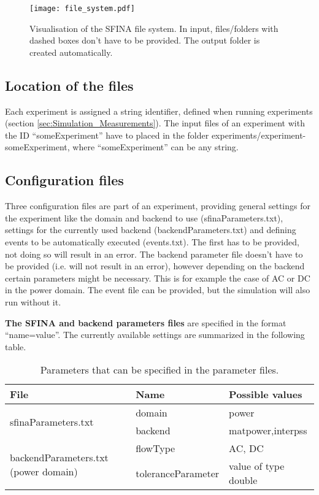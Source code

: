 \documentclass[11pt,fleqn]{book} %
\begin{document}
\begin{figure}[h]
\centering\texttt{[image: file\_system.pdf]}
\caption{Visualisation of the SFINA file system. In input, files/folders with dashed boxes don't have to be provided. The output folder is created automatically.}
\label{fig:file_system}
\end{figure}

\subsection{Location of the files}
Each experiment is assigned a string identifier, defined when running experiments (section \ref{sec:Simulation_Measurements}). The input files of an experiment with the ID “someExperiment” have to placed in the folder experiments/experiment-someExperiment, where “someExperiment” can be any string.

\subsection{Configuration files}\label{subsec:config_files}
Three configuration files are part of an experiment, providing general settings for the experiment like the domain and backend to use (sfinaParameters.txt), settings for the currently used backend (backendParameters.txt) and defining events to be automatically executed (events.txt). The first has to be provided, not doing so will result in an error. The backend parameter file doesn’t have to be provided (i.e. will not result in an error), however depending on the backend certain parameters might be necessary. This is for example the case of AC or DC in the power domain. The event file can be provided, but the simulation will also run without it. 

\textbf{The SFINA and backend parameters files} are specified in the format “name=value”. The currently available settings are summarized in the following table.

\begin{table}[h]
\centering
\begin{tabular}{|l| l| l|}
\hline
\rowcolor{Gray}
File & Name & Possible values\\
\hline
\multirow{2}{*}{sfinaParameters.txt} & domain & power \\ \cline{2-3}
 & backend & matpower,interpss \\ \hline
\multirow{2}{*}{\parbox{4cm}{backendParameters.txt (power domain)} } & flowType & AC, DC \\ 
\cline{2-3} & toleranceParameter & value of type double \\ \hline
\end{tabular}
\label{table:params}
\caption{Parameters that can be specified in the parameter files.}
\end{table}
\end{document}
